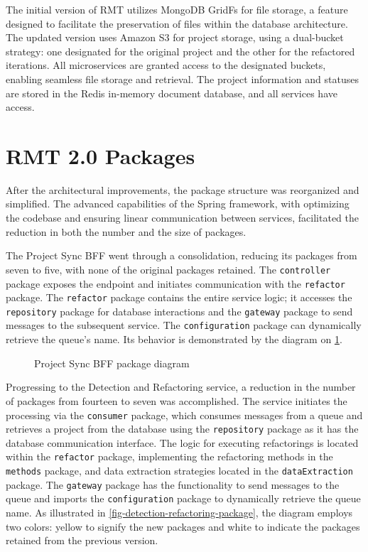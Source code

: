 The initial version of RMT utilizes MongoDB GridFs for file storage, a feature designed to facilitate the preservation of files within the database architecture. The updated version uses Amazon S3 for project storage, using a dual-bucket strategy: one designated for the original project and the other for the refactored iterations. All microservices are granted access to the designated buckets, enabling seamless file storage and retrieval. The project information and statuses are stored in the Redis in-memory document database, and all services have access.

\section{RMT 2.0 Packages}
\label{sec-packages}

After the architectural improvements, the package structure was reorganized and simplified. The advanced capabilities of the Spring framework, with optimizing the codebase and ensuring linear communication between services, facilitated the reduction in both the number and the size of packages.

The Project Sync BFF went through a consolidation, reducing its packages from seven to five, with none of the original packages retained. The \texttt{controller} package exposes the endpoint and initiates communication with the \texttt{refactor} package. The \texttt{refactor} package contains the entire service logic; it accesses the \texttt{ repository} package for database interactions and the \texttt{gateway} package to send messages to the subsequent service. The \texttt{configuration} package can dynamically retrieve the queue's name. Its behavior is demonstrated by the diagram on \cref{fig-project-sync-package}.

\begin{figure}[ht!]
\SetCaptionWidth{\textwidth}
\caption{Project Sync BFF package diagram}
\label{fig-project-sync-package}
\fontsize{8}{10}\selectfont

\end{figure}
\FloatBarrier

Progressing to the Detection and Refactoring service, a reduction in the number of packages from fourteen to seven was accomplished. The service initiates the processing via the \texttt{consumer} package, which consumes messages from a queue and retrieves a project from the database using the \texttt{repository} package as it has the database communication interface. The logic for executing refactorings is located within the \texttt{refactor} package, implementing the refactoring methods in the \texttt{methods} package, and data extraction strategies located in the \texttt{dataExtraction} package. The \texttt{gateway} package has the functionality to send messages to the queue and imports the \texttt{configuration} package to dynamically retrieve the queue name. As illustrated in \cref{fig-detection-refactoring-package}, the diagram employs two colors: yellow to signify the new packages and white to indicate the packages retained from the previous version.

